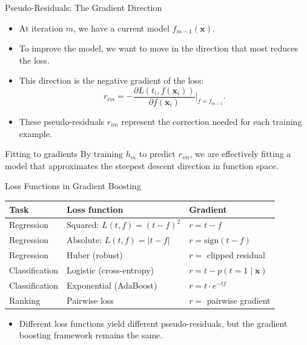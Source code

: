 \begin{frame}{Pseudo-Residuals: The Gradient Direction}
  \begin{itemize}
    \item At iteration $m$, we have a current model $f_{m-1}(\mathbf{x})$.
    \item To improve the model, we want to move in the direction that \alert{most reduces the loss}.
    \item This direction is the \alert{negative gradient} of the loss:
          \[
          r_{im} = -\frac{\partial L(t_i, f(\mathbf{x}_i))}{\partial f(\mathbf{x}_i)}\bigg|_{f = f_{m-1}}.
          \]
    \item These pseudo-residuals $r_{im}$ represent the \alert{correction} needed for each
          training example.
  \end{itemize}
  \begin{block}{Fitting to gradients}
    By training $h_m$ to predict $r_{im}$, we are effectively fitting a model that approximates
    the \alert{steepest descent direction} in function space.
  \end{block}
\end{frame}

\begin{frame}{Loss Functions in Gradient Boosting}
  \renewcommand{\arraystretch}{1.4}
  \begin{center}
  \begin{tabular}{lll}
    \toprule
    \textbf{Task} & \textbf{Loss function} & \textbf{Gradient} \\
    \midrule
    Regression & Squared: $L(t, f) = (t - f)^2$ & $r = t - f$ \\
    Regression & Absolute: $L(t, f) = |t - f|$ & $r = \text{sign}(t - f)$ \\
    Regression & Huber (robust) & $r = $ clipped residual \\
    Classification & Logistic (cross-entropy) & $r = t - p(t=1 \mid \mathbf{x})$ \\
    Classification & Exponential (AdaBoost) & $r = t \cdot e^{-tf}$ \\
    Ranking & Pairwise loss & $r = $ pairwise gradient \\
    \bottomrule
  \end{tabular}
  \end{center}
  \vspace{0.4em}
  \begin{itemize}
    \item Different loss functions yield different pseudo-residuals, but the gradient boosting
          framework remains the same.
  \end{itemize}
\end{frame}

